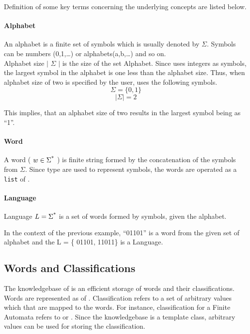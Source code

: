 Definition of some key terms concerning the underlying concepts are listed below.

\paragraph{Alphabet} An alphabet is a finite set of symbols which is usually denoted by $\Sigma$. 
Symbols can be numbers (0,1,\ldots) or alphabets(a,b,\ldots) and so on. \\
Alphabet size $\mid$ $\Sigma$ $\mid$ is the size of the set Alphabet. Since \libalf uses integers as symbols, the largest symbol in the alphabet is one less than the alphabet size. Thus, when alphabet size of two is specified by the user, \libalf uses the following symbols. 
\[
\Sigma = \{0,1\}
\]
\[
\mid \Sigma \mid = 2
\]

This implies, that an alphabet size of two results in the largest symbol being as ``1''.

\paragraph{Word} A word ( $ w \in \Sigma \textsuperscript{*} $ ) is finite string formed by the concatenation of the symbols from $\Sigma$. Since \integer type are used to represent symbols, the words are operated as a \texttt{list} of \integer.  

\paragraph{Language} Language $ L = \Sigma \textsuperscript{*} $ is a set of words formed by symbols, given the alphabet.

In the context of the previous example, ``01101'' is a word from the given set of alphabet and the L = \{ 01101, 11011\} is a Language.

\subsection*{Words and Classifications} 
The knowledgebase of \libalf is an efficient storage of words and their classifications. Words are represented as \lists of \integer. Classification refers to a set of arbitrary values which that are mapped to the words. For instance, classification for a Finite Automata refers to \true or \false. Since the knowledgebase is a template class, arbitrary values can be used for storing the classification. 

